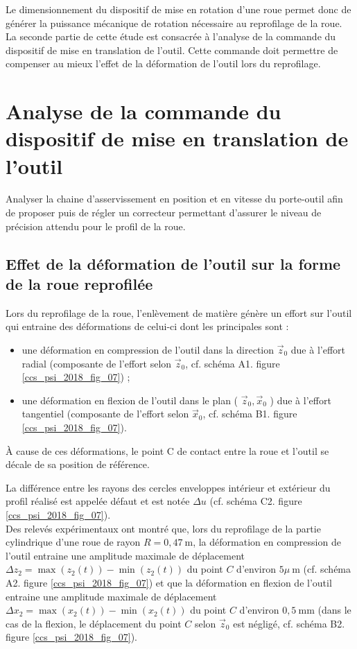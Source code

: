 Le dimensionnement du dispositif de mise en rotation d'une roue permet donc de générer la puissance mécanique de rotation nécessaire au reprofilage de la roue. La seconde partie de cette étude est consacrée à l'analyse de la commande du dispositif de mise en translation de l'outil. Cette commande doit permettre de compenser au mieux l'effet de la déformation de l'outil lors du reprofilage.

\section{Analyse de la commande du dispositif de mise en translation de l'outil}
\begin{obj}
Analyser la chaine d'asservissement en position et en vitesse du porte-outil afin de proposer puis de régler un correcteur permettant d'assurer le niveau de précision attendu pour le profil de la roue.
\end{obj}

\subsection{Effet de la déformation de l'outil sur la forme de la roue reprofilée}
Lors du reprofilage de la roue, l'enlèvement de matière génère un effort sur l'outil qui entraine des déformations de celui-ci dont les principales sont :

\begin{itemize}
  \item une déformation en compression de l'outil dans la direction $\vec{z}_{0}$ due à l'effort radial (composante de l'effort selon $\vec{z}_{0}$, cf. schéma A1. figure \ref{ccs_psi_2018_fig_07}) ;
  \item une déformation en flexion de l'outil dans le plan ( $\vec{z}_{0}, \vec{x}_{0}$ ) due à l'effort tangentiel (composante de l'effort selon $\vec{x}_{0}$, cf. schéma B1. figure \ref{ccs_psi_2018_fig_07}).
  \end{itemize}
  
À cause de ces déformations, le point C de contact entre la roue et l'outil se décale de sa position de référence.

La différence entre les rayons des cercles enveloppes intérieur et extérieur du profil réalisé est appelée défaut et est notée $\Delta u$ (cf. schéma C2. figure \ref{ccs_psi_2018_fig_07}).\\
Des relevés expérimentaux ont montré que, lors du reprofilage de la partie cylindrique d'une roue de rayon $R=0,47 \mathrm{~m}$, la déformation en compression de l'outil entraine une amplitude maximale de déplacement $\Delta z_{2}= \max \left(z_{2}(t)\right)-\min \left(z_{2}(t)\right)$ du point $C$ d'environ $5 \mu \mathrm{~m}$ (cf. schéma A2. figure \ref{ccs_psi_2018_fig_07}) et que la déformation en flexion de l'outil entraine une amplitude maximale de déplacement $\Delta x_{2}=\max \left(x_{2}(t)\right)-\min \left(x_{2}(t)\right)$ du point $C$ d'environ $0,5 \mathrm{~mm}$ (dans le cas de la flexion, le déplacement du point $C$ selon $\vec{z}_{0}$ est négligé, cf. schéma B2. figure \ref{ccs_psi_2018_fig_07}).\\

